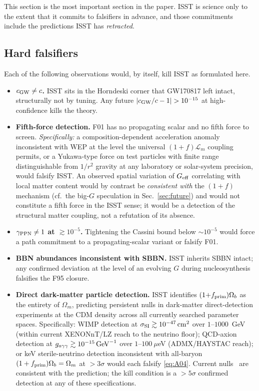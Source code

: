 \documentclass[aps,prd,twocolumn,nofootinbib,floatfix,superscriptaddress]{revtex4-2}
\newcommand{\Lm}{\mathcal{L}_m}
\newcommand{\fprim}{f_{\rm prim}}
\begin{document}
This section is the most important section in the paper. ISST is
science only to the extent that it commits to falsifiers in advance,
and those commitments include the predictions ISST has
\emph{retracted}.

\subsection{Hard falsifiers}

Each of the following observations would, by itself, kill ISST as
formulated here.

\begin{itemize}
\item \textbf{$c_{\rm GW}\neq c$.} ISST sits in the Horndeski corner
that GW170817 left intact, structurally not by tuning. Any future
$|c_{\rm GW}/c-1|>10^{-15}$ at high-confidence kills the theory.
\item \textbf{Fifth-force detection.} F01 has no propagating scalar
and no fifth force to screen. \emph{Specifically:} a
composition-dependent acceleration anomaly inconsistent with WEP
at the level the universal $(1{+}f)\Lm$ coupling permits, or a
Yukawa-type force on test particles with finite range
distinguishable from $1/r^2$ gravity at any laboratory or
solar-system precision, would falsify ISST. An observed spatial
variation of $G_{\rm eff}$ correlating with local matter content
would by contrast be \emph{consistent with} the $(1{+}f)$ mechanism
(cf.\ the big-$G$ speculation in Sec.~\ref{sec:future}) and would
not constitute a fifth force in the ISST sense; it would be a
detection of the structural matter coupling, not a refutation of
its absence.
\item \textbf{$\gamma_{\rm PPN}\neq 1$ at $\gtrsim 10^{-5}$.}
Tightening the Cassini bound below ${\sim}10^{-5}$ would force a
path commitment to a propagating-scalar variant or falsify F01.
\item \textbf{BBN abundances inconsistent with SBBN.} ISST inherits
SBBN intact; any confirmed deviation at the level of an evolving
$G$ during nucleosynthesis falsifies the F95 closure.
\item \textbf{Direct dark-matter particle detection.} ISST
identifies $(1{+}\fprim)\Omega_b$ as the entirety of $\Omega_m$,
predicting persistent nulls in dark-matter direct-detection
experiments at the CDM density across all currently searched
parameter spaces. Specifically: WIMP detection at
$\sigma_{\rm SI}\gtrsim 10^{-47}\,{\rm cm}^2$ over $1$--$1000$~GeV
(within current XENONnT/LZ reach to the neutrino floor); QCD-axion
detection at $g_{a\gamma\gamma}\gtrsim 10^{-15}\,{\rm GeV}^{-1}$
over $1$--$100~\mu$eV (ADMX/HAYSTAC reach); or keV sterile-neutrino
detection inconsistent with all-baryon
$(1+\fprim)\Omega_b = \Omega_m$ at $>3\sigma$ would each falsify
\eqref{eq:A04}. Current
nulls~\cite{XENONnT2023,LUXZEPLIN2023,ADMX2021} are consistent with
the prediction; the kill condition is a $>5\sigma$ confirmed
detection at any of these specifications.
\end{itemize}
\end{document}
